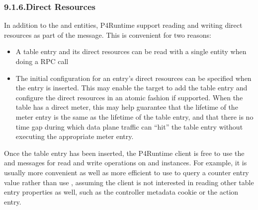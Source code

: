 \documentclass[11pt]{article}
\begin{document}
{%
\subsubsection{9.1.6.\hspace*{0.5em}Direct Resources}\label{sec-direct-resources}%

\noindent{}In addition to the  and  entities,
P4Runtime support reading and writing direct resources as part of the
 message.  This is convenient for two reasons:%

\begin{itemize}%

\item{}
A table entry and its direct resources can be read with a single entity when
doing a  RPC call%

\item{}
The initial configuration for an entry's direct resources can be specified
when the entry is inserted. This may enable the target to add the table entry
and configure the direct resources in an atomic fashion if supported. When the
table has a direct meter, this may help guarantee that the lifetime of the
meter entry is the same as the lifetime of the table entry, and that there is
no time gap during which data plane traffic can \textquotedblleft{}hit\textquotedblright{} the table entry without
executing the appropriate meter entry.%
\end{itemize}%

\noindent{}Once the table entry has been inserted, the P4Runtime client is free to use the
 and  messages for read and write
operations on  and  instances. For example, it is
usually more convenient as well as more efficient to use  to
query a counter entry value rather than use , assuming the client is
not interested in reading other table entry properties as well, such as the
controller metadata cookie or the action entry.%

}
\end{document}
